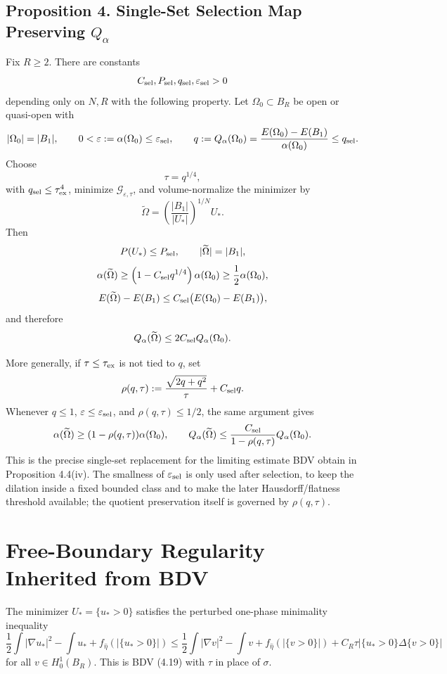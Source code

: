 \documentclass[11pt]{article}
\begin{document}
\subsection*{Proposition 4. Single-Set Selection Map Preserving \(Q_\alpha\)}

Fix \(R\ge2\). There are constants
\[
C_{\rm sel},P_{\rm sel},q_{\rm sel},\varepsilon_{\rm sel}>0
\]
depending only on \(N,R\) with the following property. Let
\(\Omega_0\subset B_R\) be open or quasi-open with
\[
|\Omega_0|=|B_1|,
\qquad
0<\varepsilon:=\alpha(\Omega_0)\le\varepsilon_{\rm sel},
\qquad
q:=Q_\alpha(\Omega_0)=\frac{E(\Omega_0)-E(B_1)}{\alpha(\Omega_0)}
\le q_{\rm sel}.
\]
Choose
\[
\tau=q^{1/4},
\]
with \(q_{\rm sel}\le\tau_{\rm ex}^4\), minimize
\(\mathcal G_{\varepsilon,\tau}\), and volume-normalize the minimizer by
\[
\widetilde\Omega
=
\left(\frac{|B_1|}{|U_*|}\right)^{1/N}U_*.
\]
Then
\[
P(U_*)\le P_{\rm sel},
\qquad
|\widetilde\Omega|=|B_1|,
\]
\[
\alpha(\widetilde\Omega)
\ge
\left(1-C_{\rm sel}q^{1/4}\right)\alpha(\Omega_0)
\ge
\frac12\alpha(\Omega_0),
\]
\[
E(\widetilde\Omega)-E(B_1)
\le
C_{\rm sel}\bigl(E(\Omega_0)-E(B_1)\bigr),
\]
and therefore
\[
Q_\alpha(\widetilde\Omega)
\le
2C_{\rm sel}Q_\alpha(\Omega_0).
\]

More generally, if \(\tau\le\tau_{\rm ex}\) is not tied to \(q\), set
\[
\rho(q,\tau)
:=
\frac{\sqrt{2q+q^2}}{\tau}+C_{\rm sel}q.
\]
Whenever \(q\le1\), \(\varepsilon\le\varepsilon_{\rm sel}\), and
\(\rho(q,\tau)\le1/2\), the same argument gives
\[
\alpha(\widetilde\Omega)\ge(1-\rho(q,\tau))\alpha(\Omega_0),
\qquad
Q_\alpha(\widetilde\Omega)
\le
\frac{C_{\rm sel}}{1-\rho(q,\tau)}Q_\alpha(\Omega_0).
\]
This is the precise single-set replacement for the limiting estimate BDV
obtain in Proposition 4.4(iv). The smallness of \(\varepsilon_{\rm sel}\) is
only used after selection, to keep the dilation inside a fixed bounded class
and to make the later Hausdorff/flatness threshold available; the quotient
preservation itself is governed by \(\rho(q,\tau)\).

\section{Free-Boundary Regularity Inherited from BDV}

The minimizer \(U_*=\{u_*>0\}\) satisfies the perturbed one-phase minimality
inequality
\[
\frac12\int |\nabla u_*|^2-\int u_*
+f_{\hat\eta}(|\{u_*>0\}|)
\le
\frac12\int |\nabla v|^2-\int v
+f_{\hat\eta}(|\{v>0\}|)
+C_R\tau|\{u_*>0\}\Delta\{v>0\}|
\]
for all \(v\in H^1_0(B_R)\). This is BDV (4.19) with \(\tau\) in place of
\(\sigma\).
\end{document}
